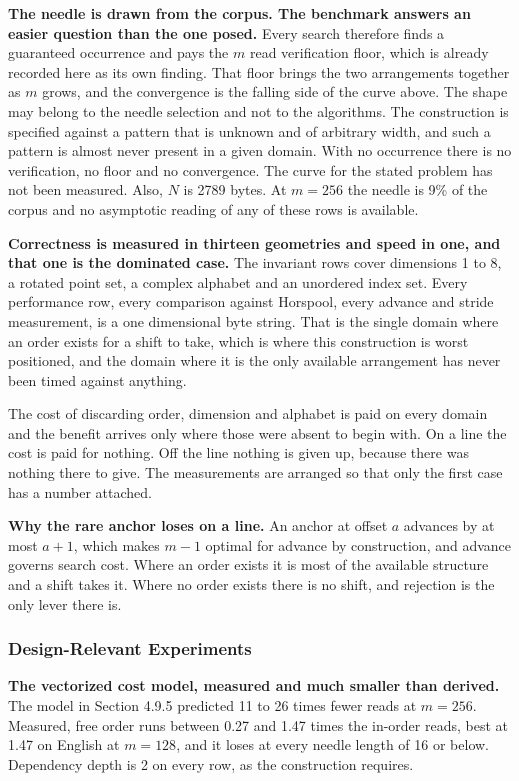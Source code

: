 \textbf{The needle is drawn from the corpus. The benchmark answers an easier question than the one posed.} Every search therefore finds a guaranteed occurrence and pays the \(m\) read verification floor, which is already recorded here as its own finding. That floor brings the two arrangements together as \(m\) grows, and the convergence is the falling side of the curve above. The shape may belong to the needle selection and not to the algorithms. The construction is specified against a pattern that is unknown and of arbitrary width, and such a pattern is almost never present in a given domain. With no occurrence there is no verification, no floor and no convergence. The curve for the stated problem has not been measured. Also, \(N\) is 2789 bytes. At \(m = 256\) the needle is 9\% of the corpus and no asymptotic reading of any of these rows is available.

\textbf{Correctness is measured in thirteen geometries and speed in one, and that one is the dominated case.} The invariant rows cover dimensions 1 to 8, a rotated point set, a complex alphabet and an unordered index set. Every performance row, every comparison against Horspool, every advance and stride measurement, is a one dimensional byte string. That is the single domain where an order exists for a shift to take, which is where this construction is worst positioned, and the domain where it is the only available arrangement has never been timed against anything.

The cost of discarding order, dimension and alphabet is paid on every domain and the benefit arrives only where those were absent to begin with. On a line the cost is paid for nothing. Off the line nothing is given up, because there was nothing there to give. The measurements are arranged so that only the first case has a number attached.

\textbf{Why the rare anchor loses on a line.} An anchor at offset \(a\) advances by at most \(a+1\), which makes \(m-1\) optimal for advance by construction, and advance governs search cost. Where an order exists it is most of the available structure and a shift takes it. Where no order exists there is no shift, and rejection is the only lever there is.

\subsubsection{Design-Relevant Experiments}

\textbf{The vectorized cost model, measured and much smaller than derived.} The model in Section 4.9.5 predicted 11 to 26 times fewer reads at \(m = 256\). Measured, free order runs between 0.27 and 1.47 times the in-order reads, best at 1.47 on English at \(m = 128\), and it loses at every needle length of 16 or below. Dependency depth is 2 on every row, as the construction requires.

